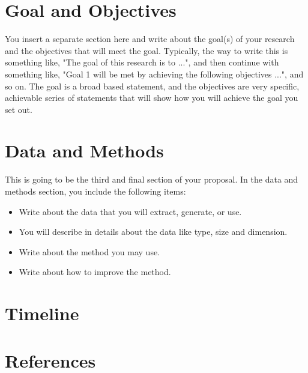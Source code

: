 \documentclass[letterpaper]{article}
\begin{document}
\section*{Goal and Objectives}
You insert a separate section here and write about the goal(s) of your research and the objectives
that will meet the goal. Typically, the way to write this is something like, "The goal of this research
is to ...", and then continue with something like, "Goal 1 will be met by achieving the following
objectives ...", and so on. The goal is a broad based statement, and the objectives are very specific,
achievable series of statements that will show how you will achieve the goal you set out.

\section*{Data and Methods}
This is going to be the third and final section of your proposal. In the data and methods section,
you include the following items:
\begin{itemize}
	\item Write about the data that you will extract, generate, or use.
	\item You will describe in details about the data like type, size and dimension. 
	\item Write about the method you may use.
	\item Write about how to improve the method.
\end{itemize}
\section*{Timeline}
\section*{References}
\end{document}
